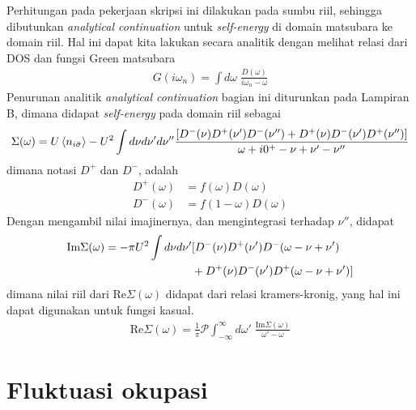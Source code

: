 Perhitungan pada pekerjaan skripsi ini dilakukan pada sumbu riil, sehingga dibutunkan \textit{analytical continuation} untuk \textit{self-energy} di domain matsubara ke domain riil. Hal ini dapat kita lakukan secara analitik dengan melihat relasi dari DOS dan fungsi Green matsubara
\begin{align}
G(i\omega_n) = \int d\omega \; \frac{D(\omega)}{i\omega_n - \omega}
\end{align}
Penurunan analitik \textit{analytical continuation} bagian ini diturunkan pada Lampiran B, dimana didapat \textit{self-energy} pada domain riil sebagai
\begin{align}
\Sigma(\omega) = U\left< n_{i\bar{\sigma}} \right> - U^2 \int d\nu d\nu' d\nu'' \frac{[D^-(\nu)D^+(\nu')D^-(\nu'') + D^+(\nu)D^-(\nu')D^+(\nu'')]}{\omega + i0^+ - \nu + \nu' - \nu''}\notag
\end{align}
dimana notasi $D^+$ dan $D^-$, adalah
\begin{align}
D^+(\omega) &= f(\omega)D(\omega)\\
D^-(\omega) &= f(1 - \omega)D(\omega)
\end{align}
Dengan mengambil nilai imajinernya, dan mengintegrasi terhadap $\nu''$, didapat
\begin{align}
\text{Im}\Sigma(\omega) = -\pi U^2 \int d\nu d\nu' &[D^-(\nu)D^+(\nu')D^-(\omega - \nu + \nu') \notag\\
&+ D^+(\nu)D^-(\nu')D^+(\omega - \nu + \nu')]
\end{align}
dimana nilai riil dari $\text{Re}\Sigma(\omega)$ didapat dari relasi kramers-kronig, yang hal ini dapat digunakan untuk fungsi kasual.
\begin{align}
\text{Re}\Sigma(\omega) = \frac{1}{\pi}\mathcal{P}\int_{-\infty}^\infty d\omega' \;\frac{\text{Im}\Sigma(\omega)}{\omega' - \omega}
\end{align}

\section{Fluktuasi okupasi}

